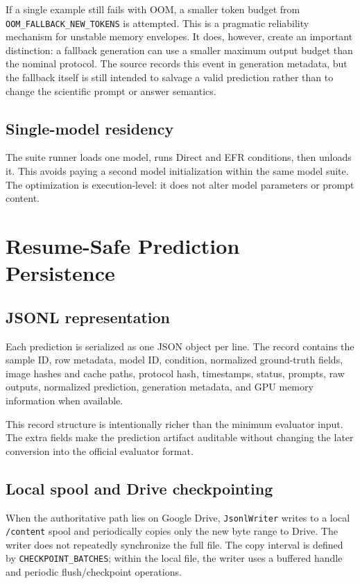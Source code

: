 \documentclass[11pt,a4paper]{article}
\newcommand{\code}[1]{\texttt{#1}}
\begin{document}
If a single example still fails with OOM, a smaller token budget from \code{OOM\_FALLBACK\_NEW\_TOKENS} is attempted. This is a pragmatic reliability mechanism for unstable memory envelopes. It does, however, create an important distinction: a fallback generation can use a smaller maximum output budget than the nominal protocol. The source records this event in generation metadata, but the fallback itself is still intended to salvage a valid prediction rather than to change the scientific prompt or answer semantics.

\subsection{Single-model residency}
The suite runner loads one model, runs Direct and EFR conditions, then unloads it. This avoids paying a second model initialization within the same model suite. The optimization is execution-level: it does not alter model parameters or prompt content.

\section{Resume-Safe Prediction Persistence}
\subsection{JSONL representation}
Each prediction is serialized as one JSON object per line. The record contains the sample ID, row metadata, model ID, condition, normalized ground-truth fields, image hashes and cache paths, protocol hash, timestamps, status, prompts, raw outputs, normalized prediction, generation metadata, and GPU memory information when available.

This record structure is intentionally richer than the minimum evaluator input. The extra fields make the prediction artifact auditable without changing the later conversion into the official evaluator format.

\subsection{Local spool and Drive checkpointing}
When the authoritative path lies on Google Drive, \code{JsonlWriter} writes to a local \code{/content} spool and periodically copies only the new byte range to Drive. The writer does not repeatedly synchronize the full file. The copy interval is defined by \code{CHECKPOINT\_BATCHES}; within the local file, the writer uses a buffered handle and periodic flush/checkpoint operations.
\end{document}
